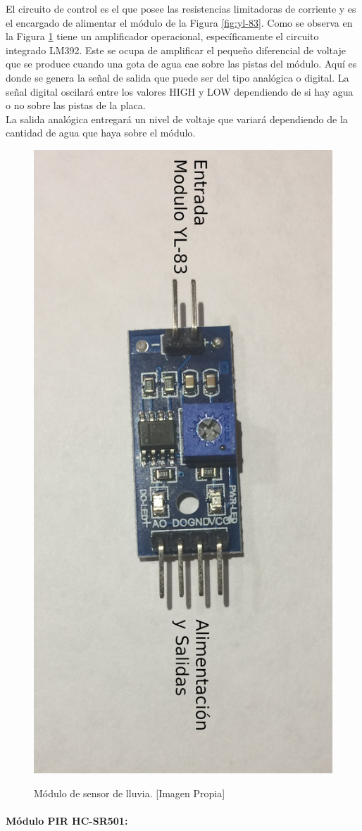 El circuito de control es el que posee las resistencias limitadoras de corriente y es el encargado de alimentar el módulo de la Figura \ref{fig:yl-83}. Como se observa en la Figura \ref{fig:yl-831} tiene un amplificador operacional, específicamente el circuito integrado LM392. Este se ocupa de amplificar el pequeño diferencial de voltaje que se produce cuando una gota de agua cae sobre las pistas del módulo. Aquí es donde se genera la señal de salida que puede ser del tipo analógica o digital. La señal digital oscilará entre los valores HIGH y LOW dependiendo de si hay agua o no sobre las pistas de la placa.\\

La salida analógica entregará un nivel de voltaje que variará dependiendo de la cantidad de agua que haya sobre el módulo.\cite{LLU}\\

\begin{figure}[H]
	\centering
	\caption[Módulo de sensor de lluvia.]{Módulo de sensor de lluvia. [Imagen Propia]}
	\includegraphics[width=0.5\linewidth]{Imagenes/YL-831}
	\label{fig:yl-831}
\end{figure}

\paragraph{Módulo PIR HC-SR501: }

